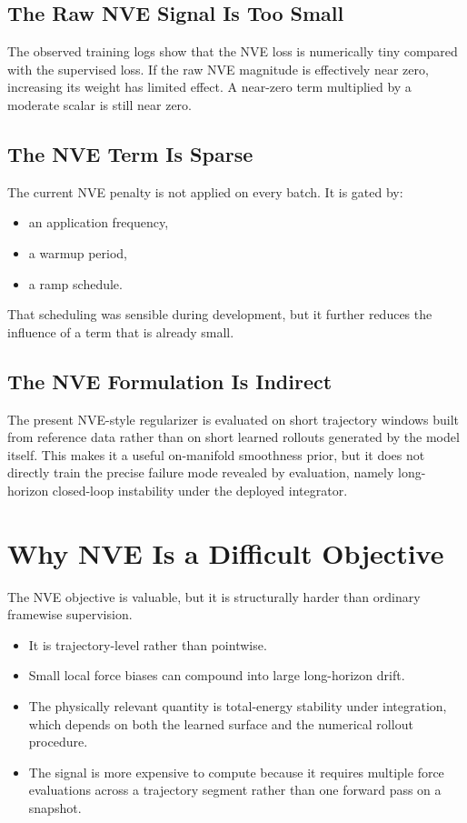 \documentclass[11pt]{article}
\begin{document}
\subsection{The Raw NVE Signal Is Too Small}

The observed training logs show that the NVE loss is numerically tiny compared with the supervised loss. If the raw NVE magnitude is effectively near zero, increasing its weight has limited effect. A near-zero term multiplied by a moderate scalar is still near zero.

\subsection{The NVE Term Is Sparse}

The current NVE penalty is not applied on every batch. It is gated by:

\begin{itemize}
  \item an application frequency,
  \item a warmup period,
  \item a ramp schedule.
\end{itemize}

That scheduling was sensible during development, but it further reduces the influence of a term that is already small.

\subsection{The NVE Formulation Is Indirect}

The present NVE-style regularizer is evaluated on short trajectory windows built from reference data rather than on short learned rollouts generated by the model itself. This makes it a useful on-manifold smoothness prior, but it does not directly train the precise failure mode revealed by evaluation, namely long-horizon closed-loop instability under the deployed integrator.

\section{Why NVE Is a Difficult Objective}

The NVE objective is valuable, but it is structurally harder than ordinary framewise supervision.

\begin{itemize}
  \item It is trajectory-level rather than pointwise.
  \item Small local force biases can compound into large long-horizon drift.
  \item The physically relevant quantity is total-energy stability under integration, which depends on both the learned surface and the numerical rollout procedure.
  \item The signal is more expensive to compute because it requires multiple force evaluations across a trajectory segment rather than one forward pass on a snapshot.
\end{itemize}
\end{document}
